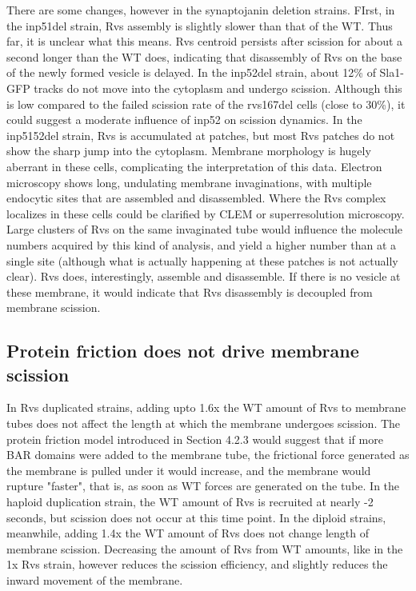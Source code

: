 	\vspace{5mm}
There are some changes, however in the synaptojanin deletion strains. FIrst, in the inp51del strain, Rvs assembly is slightly slower than that of the WT. Thus far, it is unclear what this means. Rvs centroid persists after scission for about a second longer than the WT does, indicating that disassembly of Rvs on the base of the newly formed vesicle is delayed. In the inp52del strain, about 12\% of Sla1-GFP tracks do not move into the cytoplasm and undergo scission. Although this is low compared to the failed scission rate of the rvs167del cells (close to 30\%), it could suggest a moderate influence of inp52 on scission dynamics. In the inp5152del strain, Rvs is accumulated at patches, but most Rvs patches do not show the sharp jump into the cytoplasm. Membrane morphology is hugely aberrant in these cells, complicating the interpretation of this data. 
Electron microscopy shows long, undulating membrane invaginations, with multiple endocytic sites that are assembled and disassembled. Where the Rvs complex localizes in these cells could be clarified by CLEM or superresolution microscopy. Large clusters of Rvs on the same invaginated tube would influence the molecule numbers acquired by this kind of analysis, and yield a higher number than at a single site (although what is actually happening at these patches is not actually clear). Rvs does, interestingly, assemble and disassemble. If there is no vesicle at these membrane, it would indicate that Rvs disassembly is decoupled from membrane scission.


\subsection{Protein friction does not drive membrane scission}
In Rvs duplicated strains, adding upto 1.6x the WT amount of Rvs to membrane tubes does not affect the length at which the membrane undergoes scission. The protein friction model introduced in Section 4.2.3 would suggest that if more BAR domains were added to the membrane tube, the frictional force generated as the membrane is pulled under it would increase, and the membrane would rupture "faster", that is, as soon as WT forces are generated on the tube. In the haploid duplication strain, the WT amount of Rvs is recruited at nearly -2 seconds, but scission does not occur at this time point. In the diploid strains, meanwhile, adding 1.4x the WT amount of Rvs does not change length of membrane scission. Decreasing the amount of Rvs from WT amounts, like in the 1x Rvs strain, however reduces the scission efficiency, and slightly reduces the inward movement of the membrane. 


